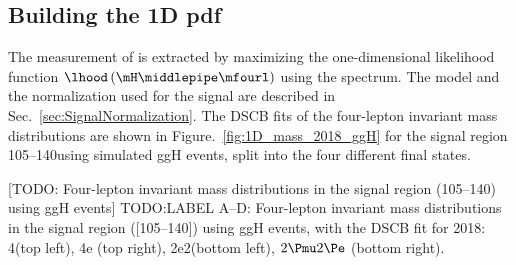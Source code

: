 \subsection{Building the 1D pdf}
The measurement of \mH is extracted by maximizing the one-dimensional likelihood function $\lhood \left( \mH \middlepipe \mfourl \right)$ using the \mfourl spectrum.  %
The model and the normalization used for the signal are described in Sec.~\ref{sec:SignalNormalization}.
The DSCB fits of the four-lepton invariant mass distributions are shown in Figure.~\ref{fig:1D_mass_2018_ggH} for the signal region 105--140\GeV using simulated ggH events, split into the four different final states.
\begin{multiFigure}
    \centering
        [TODO: Four-lepton invariant mass distributions in the signal region (105--140\GeV) using ggH events]
        {TODO:LABEL A--D: Four-lepton invariant mass distributions in the signal region ([105--140]\GeV) using ggH events, with the DSCB fit for 2018: 4\Pmu (top left), 4e (top right), 2e2\Pmu (bottom left), $2\Pmu2\Pe$ (bottom right).}
    \label{fig:1D_mass_2018_ggH}
\end{multiFigure}

